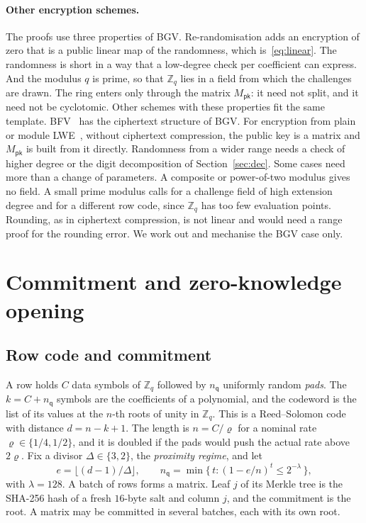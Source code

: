 \documentclass[sigconf,anonymous]{acmart}
\newcommand{\Zq}{\mathbb{Z}_q}
\newcommand{\Mpk}{M_{\mathsf{pk}}}
\newcommand{\nq}{n_{\mathsf{q}}}
\begin{document}
\paragraph{Other encryption schemes.}
The proofs use three properties of BGV. Re-randomisation adds an encryption of zero that is a
public linear map of the randomness, which is~\eqref{eq:linear}. The randomness is short in a way
that a low-degree check per coefficient can express. And the modulus $q$ is prime, so that $\Zq$
lies in a field from which the challenges are drawn. The ring enters only through the matrix
$\Mpk$: it need not split, and it need not be cyclotomic. Other schemes with these properties fit
the same template. BFV~\cite{FV12} has the ciphertext structure of BGV. For encryption from plain
or module LWE~\cite{Regev05}, without ciphertext compression, the public key is a matrix and
$\Mpk$ is built from it directly. Randomness from a wider range needs a check of higher degree or
the digit decomposition of Section~\ref{sec:dec}. Some cases need more than a change of
parameters. A composite or power-of-two modulus gives no field. A small prime modulus calls for a
challenge field of high extension degree and for a different row code, since $\Zq$ has too few
evaluation points. Rounding, as in ciphertext compression, is not linear and would need a range
proof for the rounding error. We work out and mechanise the BGV case only.

\section{Commitment and zero-knowledge opening}
\label{sec:pcs}

\subsection{Row code and commitment}

A row holds $C$ data symbols of $\Zq$ followed by $\nq$ uniformly random \emph{pads}. The
$k=C+\nq$ symbols are the coefficients of a polynomial, and the codeword is the list of its values
at the $n$-th roots of unity in $\Zq$. This is a Reed--Solomon code with distance $d=n-k+1$. The
length is $n=C/\varrho$ for a nominal rate $\varrho\in\{1/4,1/2\}$, and it is doubled if the pads
would push the actual rate above $2\varrho$. Fix a divisor $\Delta\in\{3,2\}$, the \emph{proximity
regime}, and let
\[
  e=\lfloor (d-1)/\Delta\rfloor,\qquad
  \nq=\min\{\,t : (1-e/n)^{t}\le 2^{-\lambda}\,\},
\]
with $\lambda=128$. A batch of rows forms a matrix. Leaf $j$ of its Merkle tree is the SHA-256 hash
of a fresh $16$-byte salt and column $j$, and the commitment is the root. A matrix may be committed
in several batches, each with its own root.
\end{document}

